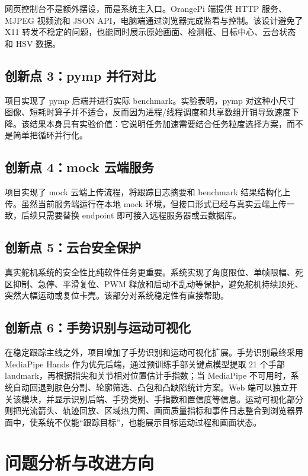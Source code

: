 \documentclass[
  oneside,
  degree=bachelor,
  field=science,
  fullwidthstop=circle,
  fontset=windows,
  times=false,
  minted=false,
  biblatex=false,
  algo=algpseudocode,
]{tongjithesis}
\begin{document}
网页控制台不是额外摆设，而是系统主入口。OrangePi 端提供 HTTP 服务、MJPEG 视频流和 JSON API，电脑端通过浏览器完成监看与控制。该设计避免了 X11 转发不稳定的问题，也能同时展示原始画面、检测框、目标中心、云台状态和 HSV 数据。

\section{创新点 3：pymp 并行对比}

项目实现了 pymp 后端并进行实际 benchmark。实验表明，pymp 对这种小尺寸图像、短耗时算子并不适合，反而因为进程/线程调度和共享数组开销导致速度下降。该结果本身具有实验价值：它说明任务加速需要结合任务粒度选择方案，而不是简单把循环并行化。

\section{创新点 4：mock 云端服务}

项目实现了 mock 云端上传流程，将跟踪日志摘要和 benchmark 结果结构化上传。虽然当前服务端运行在本地 mock 环境，但接口形式已经与真实云端上传一致，后续只需要替换 endpoint 即可接入远程服务器或云数据库。

\section{创新点 5：云台安全保护}

真实舵机系统的安全性比纯软件任务更重要。系统实现了角度限位、单帧限幅、死区抑制、急停、平滑复位、PWM 释放和启动不乱动等保护，避免舵机持续顶死、突然大幅运动或复位卡壳。该部分对系统稳定性有直接帮助。

\section{创新点 6：手势识别与运动可视化}

在稳定跟踪主线之外，项目增加了手势识别和运动可视化扩展。手势识别最终采用 MediaPipe Hands 作为优先后端，通过预训练手部关键点模型提取 21 个手部 landmark，再根据指尖和关节相对位置估计手指数；当 MediaPipe 不可用时，系统自动回退到肤色分割、轮廓筛选、凸包和凸缺陷统计方案。Web 端可以独立开关该模块，并显示识别后端、手势类别、手指数和置信度等信息。运动可视化部分则把光流箭头、轨迹回放、区域热力图、画面质量指标和事件日志整合到浏览器界面中，使系统不仅能“跟踪目标”，也能展示目标运动过程和画面状态。

\chapter{问题分析与改进方向}
\end{document}
